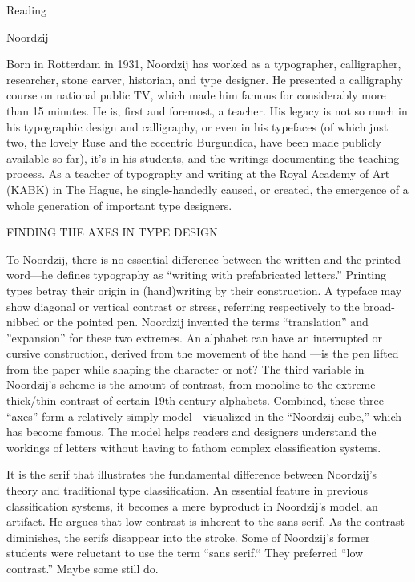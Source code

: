 \documentclass[11pt]{PalisadesLakesBook}
\begin{document}
\begin{plSection}{Reading}
\begin{plSection}{Noordzij}
\begin{plQuote}{}{}
Born in Rotterdam in 1931, Noordzij has worked 
as a typographer, calligrapher, researcher, stone carver, 
historian, and type designer. 
He presented a calligraphy course on national public TV, 
which made him famous for considerably more than 15 minutes. 
He is, first and foremost, a teacher. 
His legacy is not so much 
in his typographic design and calligraphy, 
or even in his typefaces (of which just two, 
the lovely Ruse and the eccentric Burgundica, 
have been made publicly available so far), 
it's in his students, 
and the writings documenting the teaching process. 
As a teacher of typography and writing 
at the Royal Academy of Art (KABK) in The Hague, 
he single-handedly caused, or created, 
the emergence of a whole generation of important type designers.
\end{plQuote}%

\begin{plQuote}{}{}
FINDING THE AXES IN TYPE DESIGN

To Noordzij, there is no essential difference 
between the written and the printed word---he defines typography
 as ``writing with prefabricated letters.''
 Printing types betray their origin in (hand)writing 
 by their construction. 
 A typeface may show diagonal or vertical contrast or stress, 
 referring respectively to the broad-nibbed or the pointed pen. 
 Noordzij invented the terms “translation” and ”expansion” 
 for these two extremes. 
 An alphabet can have an interrupted or cursive construction, 
 derived from the movement of the hand —is the pen lifted 
 from the paper while shaping the character or not? 
 The third variable in Noordzij's scheme is 
 the amount of contrast, 
 from monoline to the extreme thick/thin contrast 
 of certain 19th-century alphabets. 
 Combined, these three ``axes'' form 
 a relatively simply model—visualized in the ``Noordzij cube,'' 
 which has become famous. 
 The model helps readers and designers understand 
 the workings of letters 
 without having to fathom complex classification systems.

It is the serif that illustrates the fundamental difference 
between Noordzij's theory and traditional type classification. 
An essential feature in previous classification systems, 
it becomes a mere byproduct in Noordzij's model, an artifact. 
He argues that low contrast is inherent to the sans serif. 
As the contrast diminishes, the serifs disappear into the stroke. 
Some of Noordzij's former students were reluctant to use the term 
``sans serif.`` They preferred ``low contrast.'' 
Maybe some still do.


\end{plQuote}
\end{plSection}
\end{plSection}
\end{document}
